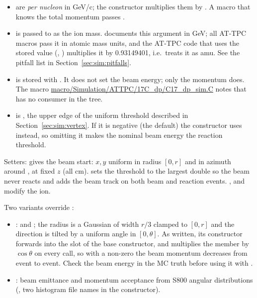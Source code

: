 \begin{itemize}
  \item {} are \emph{per nucleon} in GeV/c; the constructor multiplies them by
    . A macro that knows the total momentum passes .
  \item {} is passed to  as the ion mass.  documents this
    argument in GeV; all AT-TPC macros pass it in atomic mass units, and the AT-TPC code that uses
    the stored value (, ) multiplies it by
    0.93149401, i.e.\ treats it as amu. See the pitfall list in Section~\ref{sec:sim:pitfalls}.
  \item {} is stored with . It does not set the
    beam energy; only the momentum does. The macro \url{macro/Simulation/ATTPC/17C_dp/C17_dp_sim.C}
    notes that  has no consumer in the tree.
  \item {} is , the upper edge of the uniform threshold described in
    Section~\ref{sec:sim:vertex}. If it is negative (the default) the constructor uses 
    instead, so omitting it makes the nominal beam energy the reaction threshold.
\end{itemize}

Setters:  gives the beam start: $x,y$ uniform in radius
$[0,r]$ and in azimuth around , at fixed $z$ (all cm).
 sets the threshold to the largest double so the beam never reacts and
adds the beam track on both beam and reaction events. ,  and
 modify the ion.

Two variants override :
\begin{itemize}
  \item {}:  and
    ; the radius is a Gaussian of width $r/3$ clamped to $[0,r]$ and the
    direction is tilted by a uniform angle in $[0,\theta]$. As written, its constructor forwards
     into the  slot of the base constructor, and 
    multiplies the member  by $\cos\theta$ on every call, so with a non-zero
     the beam momentum decreases from event to event. Check the beam energy in the MC
    truth before using it with .
  \item {}: beam emittance and momentum acceptance from S800 angular
    distributions (, two histogram file names in the constructor).
\end{itemize}

